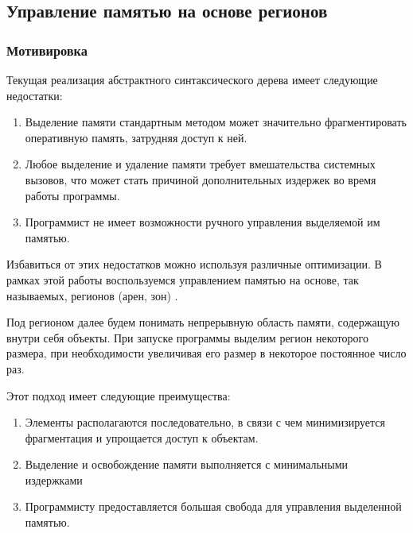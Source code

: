 \subsection{Управление памятью на основе регионов}
\subsubsection{Мотивировка}
Текущая реализация абстрактного синтаксического дерева имеет следующие 
недостатки:
\begin{enumerate}
    \item Выделение памяти стандартным методом может значительно фрагментировать
    оперативную память, затрудняя доступ к ней.
    \item Любое выделение и удаление памяти требует вмешательства системных
    вызовов, что может стать причиной дополнительных издержек во время
    работы программы.
    \item Программист не имеет возможности ручного управления выделяемой им
    памятью.
\end{enumerate}

Избавиться от этих недостатков можно используя различные оптимизации. В рамках 
этой работы воспользуемся управлением памятью на основе, так называемых, 
регионов (арен, зон) \cite{Wang}.

Под регионом далее будем понимать непрерывную область памяти, содержащую внутри 
себя объекты. При запуске программы выделим регион некоторого размера, при 
необходимости увеличивая его размер в некоторое постоянное
число раз.

Этот подход имеет следующие преимущества:
\begin{enumerate}
    \item Элементы располагаются последовательно, в связи с чем минимизируется
    фрагментация и упрощается доступ к объектам.
    \item Выделение и освобождение памяти выполняется с минимальными издержками
    \item Программисту предоставляется большая свобода для управления выделенной
    памятью.
\end{enumerate}

